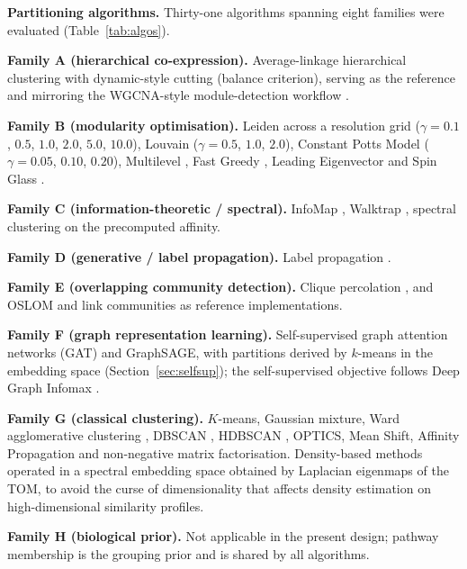 \documentclass[twocolumn,10pt,a4paper]{article}
\begin{document}
\noindent\textbf{Partitioning algorithms.} Thirty-one algorithms spanning eight families were evaluated (Table~\ref{tab:algos}).

\noindent\textbf{Family A (hierarchical co-expression).} Average-linkage hierarchical
clustering with dynamic-style cutting (balance criterion), serving as the reference and
mirroring the WGCNA-style module-detection workflow \citep{langfelder2008wgcna,langfelder2012wgcna,ward1963hierarchical}.

\noindent\textbf{Family B (modularity optimisation).} Leiden \citep{traag2019leiden} across a
resolution grid ($\gamma=0.1$, $0.5$, $1.0$, $2.0$, $5.0$, $10.0$), Louvain
\citep{blondel2008louvain} ($\gamma=0.5$, $1.0$, $2.0$), Constant Potts Model
\citep{traag2011cpm} ($\gamma=0.05$, $0.10$, $0.20$), Multilevel \citep{blondel2008louvain},
Fast Greedy \citep{clauset2004fastgreedy}, Leading Eigenvector \citep{newman2006leading} and
Spin Glass \citep{reichardt2006spin}.

\noindent\textbf{Family C (information-theoretic / spectral).} InfoMap
\citep{rosvall2008infomap}, Walktrap \citep{pons2005walktrap}, spectral clustering
 on the precomputed affinity.

\noindent\textbf{Family D (generative / label propagation).} Label propagation
\citep{raghavan2007lpa}.

\noindent\textbf{Family E (overlapping community detection).} Clique percolation
\citep{palla2005clique}, and OSLOM \citep{lancichinetti2011oslom} and link communities
\citep{ahn2010link} as reference implementations.

\noindent\textbf{Family F (graph representation learning).} Self-supervised graph attention
networks (GAT) \citep{velickovic2018gat} and GraphSAGE, with
partitions derived by $k$-means in the embedding space (Section~\ref{sec:selfsup}); the self-supervised objective follows Deep Graph Infomax \citep{velickovic2019dgi}.

\noindent\textbf{Family G (classical clustering).} $K$-means, Gaussian mixture, Ward
agglomerative clustering \citep{ward1963hierarchical}, DBSCAN \citep{ester1996dbscan},
HDBSCAN \citep{campello2013hdbscan}, OPTICS, Mean Shift, Affinity Propagation and
non-negative matrix factorisation. Density-based methods operated in a spectral
embedding space obtained by Laplacian eigenmaps of the TOM, to avoid the curse of
dimensionality that affects density estimation on high-dimensional similarity profiles.

\noindent\textbf{Family H (biological prior).} Not applicable in the present design;
pathway membership is the grouping prior and is shared by all algorithms.
\end{document}
